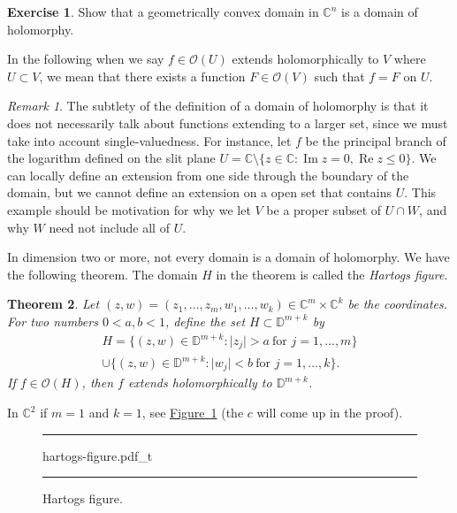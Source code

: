 \documentclass[12pt,openany]{book}
\renewcommand{\Re}{\operatorname{Re}}
\renewcommand{\Im}{\operatorname{Im}}
\newcommand{\sabs}[1]{\lvert {#1} \rvert}
\newcommand{\C}{{\mathbb{C}}}
\newcommand{\D}{{\mathbb{D}}}
\newcommand{\sO}{{\mathscr{O}}}
\newcommand{\myindex}[1]{#1\index{#1}}
\theoremstyle{plain}
\newtheorem{thm}{Theorem}[section]
\theoremstyle{remark}
\newtheorem{remark}[thm]{Remark}
\theoremstyle{definition}
\newenvironment{exbox}{%
    \def\FrameCommand{\vrule width 1pt \relax\hspace{10pt}}%
    \MakeFramed{\advance\hsize-\width\FrameRestore}%
}{%
    \endMakeFramed
}
\newenvironment{myfig}{%
\begin{figure}[h!t]
\noindent\rule{\textwidth}{0.5pt}\vspace{12pt}\par\centering}%
{\par\noindent\rule{\textwidth}{0.5pt}
\end{figure}}
\theoremstyle{exercise}
\newtheorem{exercise}{Exercise}[section]
\theoremstyle{example}
\newcommand{\figureref}[1]{\hyperref[#1]{Figure~\ref*{#1}}}
\begin{document}
\begin{exbox}
\begin{exercise}
Show that a geometrically convex domain in $\C^n$ is a domain of holomorphy.
\end{exercise}
\end{exbox}

In the following when we say $f \in \sO(U)$ extends holomorphically to $V$ where
$U \subset V$, we mean that there
exists a function $F \in \sO(V)$ such that $f = F$ on
$U$.

\begin{remark}
The subtlety of the definition of a domain of holomorphy is that it does not
necessarily talk about functions extending to a larger set, since we must
take into account single-valuedness.  For instance, let $f$ be the principal branch
of the logarithm defined on the slit plane
$U = \C \setminus \{ z \in \C : \Im z = 0, \Re z \leq 0 \}$.
We can locally define an extension from one side through the boundary
of the domain, but we cannot define an extension on a open set that
contains $U$.  This example should be motivation for why we let $V$ 
be a proper subset of $U \cap W$, and why $W$ need not include all of $U$.
\end{remark}

In dimension two or more, not every domain is a domain of holomorphy.  We have
the following theorem.  The domain $H$ in the theorem is called the
\emph{\myindex{Hartogs figure}}.

\begin{thm} \label{thm:extensionhartogsfigure}
Let $(z,w) = (z_1,\ldots,z_m,w_{1},\ldots,w_{k}) \in \C^m \times \C^k$ be the coordinates.  For two numbers
$0 < a,b < 1$, define the set $H \subset \D^{m+k}$
by
\begin{multline*}
H = \bigl\{ (z,w) \in \D^{m+k} : \sabs{z_j} > a ~\text{for $j=1,\ldots,m$}
\bigr\}
\\
\cup
\bigl\{ (z,w) \in \D^{m+k} : \sabs{w_j} < b ~\text{for $j=1,\ldots,k$}
\bigr\} .
\end{multline*}
If $f \in \sO(H)$, then $f$ extends holomorphically to $\D^{m+k}$.
\end{thm}

In $\C^2$ if $m=1$ and $k=1$, see 
\figureref{fig:hartogs-figure} (the $c$ will come up in
the proof).

\begin{myfig}
\newcommand{\hartogstext}{\parbox[t]{2.3in}{In diagrams, the Hartogs figure is
often drawn as:}}
{hartogs-figure.pdf_t}
\caption{Hartogs figure.\label{fig:hartogs-figure}}
\end{myfig}
\end{document}
